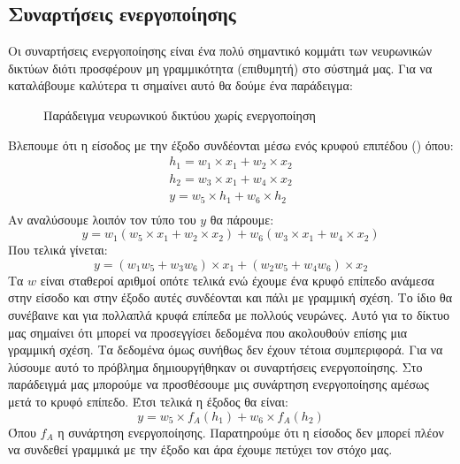 \subsection{Συναρτήσεις ενεργοποίησης}
Οι συναρτήσεις ενεργοποίησης είναι ένα πολύ σημαντικό κομμάτι των νευρωνικών δικτύων διότι προσφέρουν μη γραμμικότητα (επιθυμητή) στο σύστημά μας. Για να καταλάβουμε καλύτερα τι σημαίνει αυτό θα δούμε ένα παράδειγμα\cite{nnactmlm}:
\begin{figure}[H]
    \centering
    \caption{Παράδειγμα νευρωνικού δικτύου χωρίς ενεργοποίηση}
\end{figure}

Βλεπουμε ότι η είσοδος με την έξοδο συνδέονται μέσω ενός κρυφού επιπέδου () όπου:
\begin{gather*}
    h_1=w_1\times x_1+w_2\times x_2 \\
    h_2=w_3\times x_1+w_4\times x_2 \\
    y=w_5\times h_1+w_6\times h_2 \\
\end{gather*}
Αν αναλύσουμε λοιπόν τον τύπο του $y$ θα πάρουμε:
$$y=w_1(w_5\times x_1+w_2\times x_2) + w_6(w_3\times x_1+w_4\times x_2)$$
Που τελικά γίνεται:
$$y=(w_1w_5+w_3w_6)\times x_1+(w_2w_5+w_4w_6)\times x_2$$
Τα $w$ είναι σταθεροί αριθμοί οπότε τελικά ενώ έχουμε ένα κρυφό επίπεδο ανάμεσα στην είσοδο και στην έξοδο αυτές συνδέονται και πάλι με γραμμική σχέση. Το ίδιο θα συνέβαινε και για πολλαπλά κρυφά επίπεδα με πολλούς νευρώνες. Αυτό για το
δίκτυο μας σημαίνει ότι μπορεί να προσεγγίσει δεδομένα που ακολουθούν επίσης μια γραμμική σχέση. Τα δεδομένα όμως συνήθως δεν έχουν τέτοια συμπεριφορά. Για να λύσουμε αυτό το πρόβλημα δημιουργήθηκαν οι συναρτήσεις ενεργοποίησης. Στο
παράδειγμά μας μπορούμε να προσθέσουμε μις συνάρτηση ενεργοποίησης αμέσως μετά το κρυφό επίπεδο. Έτσι τελικά η έξοδος θα είναι:
$$y=w_5\times f_A(h_1)+w_6\times f_A(h_2)$$
Όπου $f_A$ η συνάρτηση ενεργοποίησης. Παρατηρούμε ότι η είσοδος δεν μπορεί πλέον να συνδεθεί γραμμικά με την έξοδο και άρα έχουμε πετύχει τον στόχο μας.

